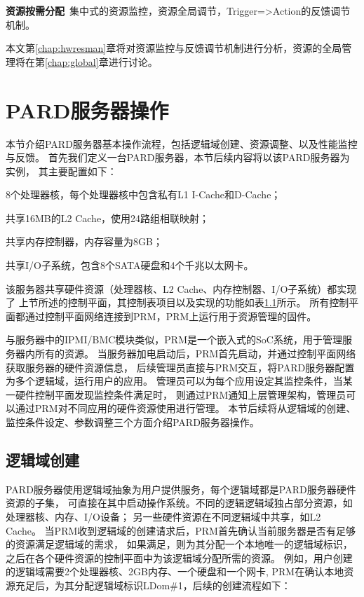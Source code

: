\textbf{资源按需分配}\ 集中式的资源监控，资源全局调节，Trigger=>Action的反馈调节机制。


本文第\ref{chap:hwresman}章将对资源监控与反馈调节机制进行分析，资源的全局管理将在第\ref{chap:global}章进行讨论。


\section{PARD服务器操作}

本节介绍PARD服务器基本操作流程，包括逻辑域创建、资源调整、以及性能监控与反馈。
首先我们定义一台PARD服务器，本节后续内容将以该PARD服务器为实例，
其主要配置如下：

8个处理器核，每个处理器核中包含私有L1 I-Cache和D-Cache；

共享16MB的L2 Cache，使用24路组相联映射；

共享内存控制器，内存容量为8GB；

共享I/O子系统，包含8个SATA硬盘和4个千兆以太网卡。

该服务器共享硬件资源（处理器核、L2 Cache、内存控制器、I/O子系统）都实现了
上节所述的控制平面，其控制表项目以及实现的功能如表\ref{}所示。
所有控制平面都通过控制平面网络连接到PRM，PRM上运行用于资源管理的固件。

与服务器中的IPMI/BMC模块类似，PRM是一个嵌入式的SoC系统，用于管理服务器内所有的资源。
当服务器加电启动后，PRM首先启动，并通过控制平面网络获取服务器的硬件资源信息，
后续管理员直接与PRM交互，将PARD服务器配置为多个逻辑域，运行用户的应用。
管理员可以为每个应用设定其监控条件，当某一硬件控制平面发现监控条件满足时，
则通过PRM通知上层管理架构，管理员可以通过PRM对不同应用的硬件资源使用进行管理。
本节后续将从逻辑域的创建、监控条件设定、参数调整三个方面介绍PARD服务器操作。

\subsection{逻辑域创建}

PARD服务器使用逻辑域抽象为用户提供服务，每个逻辑域都是PARD服务器硬件资源的子集，
可直接在其中启动操作系统。不同的逻辑逻辑域独占部分资源，如处理器核、内存、I/O设备；
另一些硬件资源在不同逻辑域中共享，如L2 Cache。
当PRM收到逻辑域的创建请求后，PRM首先确认当前服务器是否有足够的资源满足逻辑域的需求，
如果满足，则为其分配一个本地唯一的逻辑域标识，
之后在各个硬件资源的控制平面中为该逻辑域分配所需的资源。
例如，用户创建的逻辑域需要2个处理器核、2GB内存、一个硬盘和一个网卡,
PRM在确认本地资源充足后，为其分配逻辑域标识LDom\#1，后续的创建流程如下：

